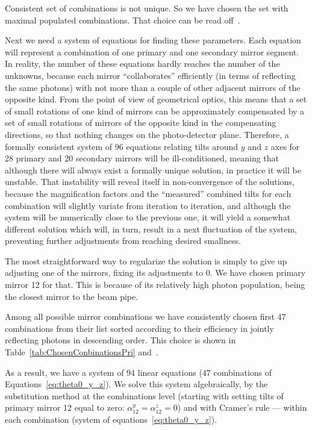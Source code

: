 Consistent set of combinations is not unique. So we have chosen the set with
maximal populated combinations. That choice can be read
off~.

Next we need a system of equations for finding these parameters. Each equation
will represent a combination of one primary and one secondary mirror segment. In
reality, the number of these equations hardly reaches the number of the
unknowns, because each mirror ``collaborates'' efficiently (in terms of
reflecting the same photons) with not more than a couple of other adjacent
mirrors of the opposite kind. From the point of view of geometrical optics, this
means that a set of small rotations of one kind of mirrors can be approximately
compensated by a set of small rotations of mirrors of the opposite kind in the
compensating directions, so that nothing changes on the photo-detector plane.
Therefore, a formally consistent system of 96 equations relating tilts around
$y$ and $z$ axes for 28 primary and 20 secondary mirrors will be
ill-conditioned, meaning that although there will always exist a formally unique
solution, in practice it will be unstable. That instability will reveal itself
in non-convergence of the solutions, because the magnification factors and the
``measured'' combined tilts for each combination will slightly variate from
iteration to iteration, and although the system will be numerically close to the
previous one, it will yield a somewhat different solution which will, in turn,
result in a next fluctuation of the system, preventing further adjustments from
reaching desired smallness.

The most straightforward way to regularize the solution is simply to give up
adjusting one of the mirrors, fixing its adjustments to 0. We have chosen
primary mirror 12 for that. This is because of its relatively high photon
population, being the closest mirror to the beam pipe.

Among all possible mirror combinations we have consistently chosen first 47
combinations from their list sorted according to their efficiency in jointly
reflecting photons in descending order. This choice is shown in
Table~\ref{tab:ChosenConbinationsPri} and~.

As a result, we have a system of 94 linear equations (47 combinations of
Equations~\ref{eq:theta0_y_z}). We solve this system algebraically, by the
substitution method at the combinations level (starting with setting tilts of
primary mirror 12 equal to zero: $\alpha^y_{12}=\alpha^z_{12}=0$) and with
Cramer's rule --- within each combination (system of
equations~\ref{eq:theta0_y_z}).

